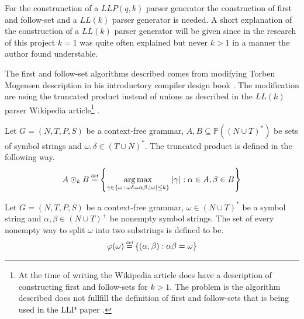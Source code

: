 For the construnction of a $LLP(q,k)$ parser generator the construction of first and follow-set \cite[p. 5]{Vagner2007} and a $LL(k)$ parser generator is needed. A short explanation of the construction of a $LL(k)$ parser generator will be given since in the research of this project $k = 1$ was quite often explained but never $k > 1$ in a manner the author found understable.

The first and follow-set algorithms described comes from modifying Torben Mogensen description in his introductory compiler design book \cite[p. 55-65]{Mogensen}. The modification are using the truncated product instead of unions as described in the $LL(k)$ parser Wikipedia article\footnote{At the time of writing the Wikipedia article does have a description of constructing first and follow-sets for $k > 1$. The problem is the algorithm described does not fullfill the definition of first and follow-sets that is being used in the LLP paper \cite[p. 5]{Vagner2007}.} \cite{wiki:LL_parser}.

\begin{definition}
    Let $G = (N, T, P, S)$ be a context-free grammar, $A, B \subseteq \mathbb{P}((N \cup T)^*)$ be sets of symbol strings and $\omega, \delta \in (T \cup N)^*$. The truncated product is defined in the following way.
    \begin{gather*}
        A \odot_k B \defeq \left\{\underset{\gamma \in \{\omega \, : \, \omega\delta = \alpha\beta, |\omega| \leq k\}}{\arg \max} \; |\gamma| : \alpha \in A, \beta \in B\right\}
    \end{gather*}
\end{definition}

\begin{definition}
    Let $G = (N, T, P, S)$ be a context-free grammar, $\omega \in (N \cup T)^*$ be a symbol string and $\alpha, \beta \in (N \cup T)^+$ be nonempty symbol strings. The set of every nonempty way to split $\omega$ into two substrings is defined to be.
    \begin{gather*}
        \varphi(\omega) \defeq \{(\alpha, \beta) : \alpha\beta = \omega\}
    \end{gather*}
\end{definition}

